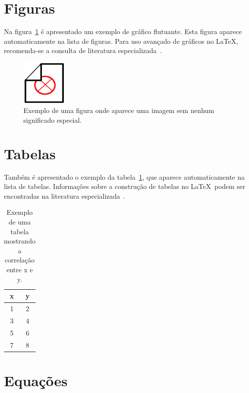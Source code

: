 \documentclass[openright]{normas-utf-tex} %
\begin{document}
\section{Figuras}

Na figura~\ref{fig:dummy} \'e apresentado um exemplo de gr\'afico flutuante. Esta figura aparece automaticamente na lista de figuras. Para uso avan\c{c}ado de gr\'aficos no \LaTeX, recomenda-se a consulta de literatura especializada~\cite{Goossens2007}.


\begin{figure}[!htb]
	\centering
	\includegraphics[width=0.2\textwidth]{./dummy.png} %
	\caption[Exemplo de uma figura]{Exemplo de uma figura onde aparece uma imagem sem nenhum significado especial.}
	\label{fig:dummy}
\end{figure}


\section{Tabelas}

Tamb\'em \'e apresentado o exemplo da tabela~\ref{tab:correlacao}, que aparece automaticamente na lista de tabelas. Informa\c{c}\~oes sobre a constru\c{c}\~ao de tabelas no \LaTeX\ podem ser encontradas na literatura especializada~\cite{Lamport1986,Buerger1989,Kopka2003,Mittelbach2004}.

\begin{table}[!htb]
	\centering
	\caption[Exemplo de uma tabela]{Exemplo de uma tabela mostrando a correla\c{c}\~ao entre x e y.}
	\label{tab:correlacao}
	\begin{tabular}{cc}
		\hline 
		x & y \\
		\hline
		1 & 2 \\
		3 & 4 \\
		5 & 6 \\
		7 & 8 \\
		\hline 
	\end{tabular}
\end{table}

\section{Equações}
\end{document}
